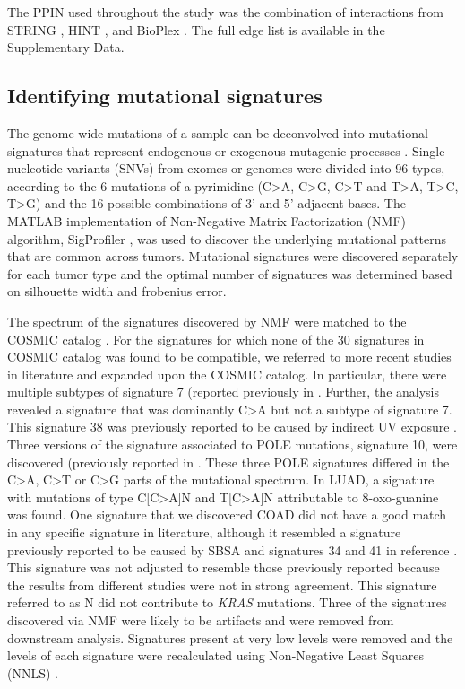 \documentclass[english, 10pt, letterpaper]{article}
\newcommand{\KRAS}{\emph{KRAS}}
\begin{document}
The PPIN used throughout the study was the combination of interactions from STRING \cite{VonMering2005, Szklarczyk2019}, HINT \cite{Das2012}, and BioPlex \cite{Huttlin2015}.
The full edge list is available in the Supplementary Data.


\subsection*{Identifying mutational signatures}

The genome-wide mutations of a sample can be deconvolved into mutational signatures that represent endogenous or exogenous mutagenic processes \cite{Alexandrov2013}. 
Single nucleotide variants (SNVs) from exomes or genomes were divided into 96 types, according to the 6 mutations of a pyrimidine (C>A, C>G, C>T and T>A, T>C, T>G) and the 16 possible combinations of 3’ and 5’ adjacent bases.
The MATLAB implementation of Non-Negative Matrix Factorization (NMF) algorithm, SigProfiler \cite{Alexandrov2013}, was used to discover the underlying mutational patterns that are common across tumors. 
Mutational signatures were discovered separately for each tumor type and the optimal number of signatures was determined based on silhouette width and frobenius error. 

The spectrum of the signatures discovered by NMF were matched to the COSMIC catalog \cite{Tate2019}.
For the signatures for which none of the 30 signatures in COSMIC catalog was found to be compatible, we referred to more recent studies in literature and expanded upon the COSMIC catalog. 
In particular, there were multiple subtypes of signature 7 (reported previously in \cite{Hayward2017Whole-genomeSubtypes., Alexandrov2018TheCancer}.
Further, the analysis revealed a signature that was dominantly C>A but not a subtype of signature 7.
This signature 38 was previously reported to be caused by indirect UV exposure \cite{Alexandrov2018TheCancer}. 
Three versions of the signature associated to POLE mutations, signature 10, were discovered (previously reported in \cite{Alexandrov2018TheCancer}.
These three POLE signatures differed in the C>A, C>T or C>G parts of the mutational spectrum. 
In LUAD, a signature with mutations of type C[C>A]N and T[C>A]N attributable to 8-oxo-guanine \cite{Alexandrov2018TheCancer} was found. 
One signature that we discovered COAD did not have a good match in any specific signature in literature, although it resembled a signature previously reported to be caused by SBSA \cite{Lee-Six2019} and signatures 34 and 41 in reference \cite{Alexandrov2018TheCancer}. 
This signature was not adjusted to resemble those previously reported because the results from different studies were not in strong agreement.
This signature referred to as N did not contribute to \KRAS{} mutations.
Three of the signatures discovered via NMF were likely to be artifacts \cite{Costello2013DiscoveryPreparation.} and were removed from downstream analysis. 
Signatures present at very low levels were removed and the levels of each signature were recalculated using Non-Negative Least Squares (NNLS) \cite{Gulhan2019DetectingSamples.}.
\end{document}
